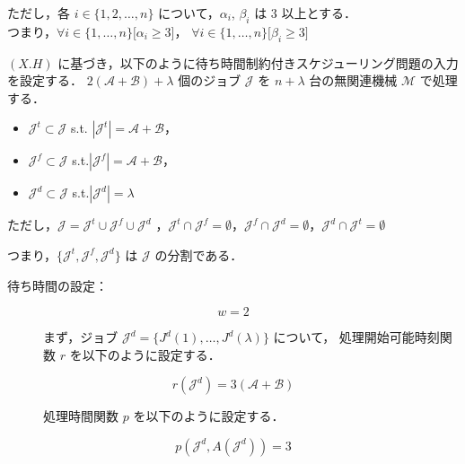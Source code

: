\documentclass[12pt]{optlab-bachelor}
\begin{document}
ただし，各 $i \in \{1,2,\ldots, n\}$ について，$\alpha_i$, $\beta_i$ は 3 以上とする．\\
つまり，$\forall i \in \{1,\ldots,n\}\big[\alpha_i \ge 3\big]$，
$\forall i \in \{1,\ldots,n\}\big[\beta_i \ge 3\big]$

$(X.H)$ に基づき，以下のように待ち時間制約付きスケジューリング問題の入力を設定する．
$2(\mathcal{A} + \mathcal{B}) + \lambda$ 個のジョブ $\mathcal{J}$ を
$n + \lambda$ 台の無関連機械 $\mathcal{M}$ で処理する．
\begin{itemize}
  \item $\mathcal{J}^t \subset \mathcal{J}$ s.t. $|\mathcal{J}^t| =
  \mathcal{A}  + \mathcal{B}$，
  \item $\mathcal{J}^f \subset \mathcal{J}$
  s.t.$|\mathcal{J}^f| = \mathcal{A}  + \mathcal{B}$，
  \item $\mathcal{J}^d \subset \mathcal{J}$ s.t.$|\mathcal{J}^d| =
  \lambda$
\end{itemize}
ただし，$\mathcal{J} = \mathcal{J}^t \cup \mathcal{J}^f \cup
\mathcal{J}^d$ ，$\mathcal{J}^t \cap \mathcal{J}^f = \emptyset$，$\mathcal{J}^f \cap \mathcal{J}^d = \emptyset$，$\mathcal{J}^d \cap \mathcal{J}^t = \emptyset$

つまり，$\{\mathcal{J}^t, \mathcal{J}^f,\mathcal{J}^d\}$ は $\mathcal{J}$ の分割である．

\begin{description}
  \item[待ち時間の設定：]
\end{description}
\begin{displaymath}
  w = 2
\end{displaymath}

\begin{description}
  \item[] まず，ジョブ $\mathcal{J}^d = \{J^d(1),\ldots,J^d({\lambda})\}$ について，
  処理開始可能時刻関数 $r$ を以下のように設定する．
\end{description}
\begin{displaymath}
  r(\mathcal{J}^d) = 3(\mathcal{A} + \mathcal{B})
\end{displaymath}

\begin{description}
  \item[] 処理時間関数 $p$ を以下のように設定する．
\end{description}
\begin{displaymath}
  p(\mathcal{J}^d, A(\mathcal{J}^d)) = 3
\end{displaymath}
\end{document}
